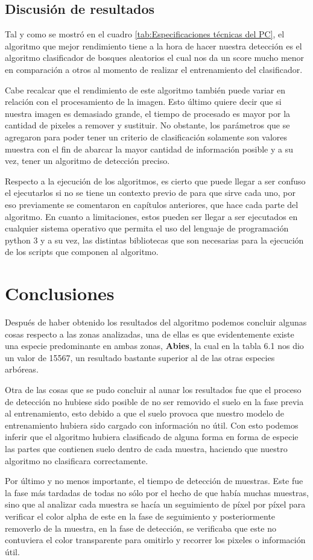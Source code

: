 \break

\section{Discusión de resultados}
Tal y como se mostró en el cuadro \ref{tab:Especificaciones técnicas del PC}, el algoritmo que mejor rendimiento tiene a la hora de hacer nuestra detección es el algoritmo clasificador de bosques aleatorios el cual nos da un score mucho menor en comparación a otros al momento de realizar el entrenamiento del clasificador.

Cabe recalcar que el rendimiento de este algoritmo también puede variar en relación con el procesamiento de la imagen. Esto último quiere decir que si nuestra imagen es demasiado grande, el tiempo de procesado es mayor por la cantidad de pixeles a remover y sustituir. 
No obstante, los parámetros que se agregaron para poder tener un criterio de clasificación solamente son valores muestra con el fin de abarcar la mayor cantidad de información posible y a su vez, tener un algoritmo de detección preciso.

Respecto a la ejecución de los algoritmos, es cierto que puede llegar a ser confuso el ejecutarlos si no se tiene un contexto previo de para que sirve cada uno, por eso previamente se comentaron en capítulos anteriores, que hace cada parte del algoritmo. En cuanto a limitaciones, estos pueden ser llegar a ser ejecutados en cualquier sistema operativo que permita el uso del lenguaje de programación python 3 y a su vez, las distintas bibliotecas que son necesarias para la ejecución de los scripts que componen al algoritmo.


\chapter{Conclusiones}
Después de haber obtenido los resultados del algoritmo podemos concluir algunas cosas respecto a las zonas analizadas, una de ellas es que evidentemente existe una especie predominante en ambas zonas, \textbf{Abies}, la cual en la tabla 6.1 nos dio un valor de 15567, un resultado bastante superior al de las otras especies arbóreas.

Otra de las cosas que se pudo concluir al aunar los resultados fue que el proceso de detección no hubiese sido posible de no ser removido el suelo en la fase previa al entrenamiento, esto debido a que el suelo provoca que nuestro modelo de entrenamiento hubiera sido cargado con información no útil. Con esto podemos inferir que el algoritmo hubiera clasificado de alguna forma en forma de especie las partes que contienen suelo dentro de cada muestra, haciendo que nuestro algoritmo no clasificara correctamente.

Por último y no menos importante, el tiempo de detección de muestras. Este fue la fase más tardadas de todas no sólo por el hecho de que había muchas muestras, sino que al analizar cada muestra se hacía un seguimiento de píxel por píxel para verificar el color alpha de este en la fase de seguimiento y posteriormente removerlo de la muestra, en la fase de detección, se verificaba que este no contuviera el color transparente para omitirlo y recorrer los pixeles o información útil.
